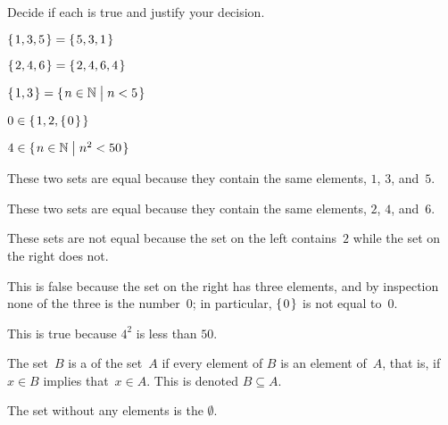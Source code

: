 \documentclass{test}  %
\begin{document}
\begin{problem} Decide if each is true and justify your decision.
\begin{items}
\item $\mbox{$\{\hspace{0.1em}1,3,5\hspace{0.1em}\}$}=\mbox{$\{\hspace{0.1em}5,3,1\hspace{0.1em}\}$}$    
\item $\mbox{$\{\hspace{0.1em}2, 4, 6\hspace{0.1em}\}$}=\mbox{$\{\hspace{0.1em}2, 4, 6, 4\hspace{0.1em}\}$}$    
\item $\mbox{$\{\hspace{0.1em}1, 3\hspace{0.1em}\}$}=\mbox{$\{\hspace{0.1em}n\in\mathbb{N}\bigm| n<5\hspace{0.1em}\}$}$ 
\item $0\in\mbox{$\{\hspace{0.1em}1,2,\mbox{$\{\hspace{0.1em}0\hspace{0.1em}\}$}\hspace{0.1em}\}$}$   
\item $4\in\mbox{$\{\hspace{0.1em}n\in\mathbb{N}\bigm| n^2<50\hspace{0.1em}\}$}$
\end{items}
\begin{answer}
\begin{items}
\item These two sets are equal because they contain the same elements, 
  $1$, $3$, and~$5$.
\item These two sets are equal because they contain the same elements, 
  $2$, $4$, and~$6$.
\item These sets are not equal because the set on the left contains~$2$
  while the set on the right does not.
\item This is false because the set on the right has three elements, 
  and by inspection none of the three is the number~$0$;
  in particular, $\mbox{$\{\hspace{0.1em}0\hspace{0.1em}\}$}$ is not equal to~$0$.
\item This is true because $4^2$ is less than $50$.    
\end{items}
\end{answer}
\end{problem}

\begin{df}
The set~$B$ is a  of the set~$A$
if every element of $B$ is an element of~$A$,
that is, if $x\in B$ implies that~$x\in A$.
This is denoted $B\subseteq A$.
\end{df}

\begin{df}
The set without any elements is the  $\emptyset$.  
\end{df}
\end{document}
